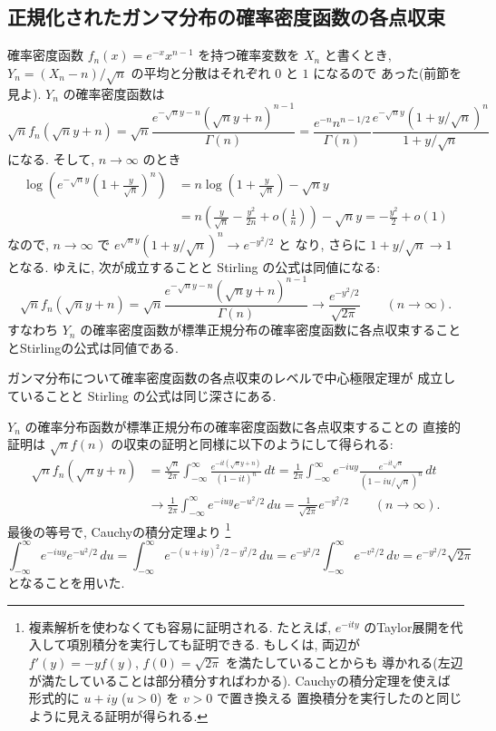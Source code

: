\documentclass[12pt,twoside]{jarticle}
\theoremstyle{jplain}
\theoremstyle{jplain}
\theoremstyle{jplain}
\numberwithin{theorem}{section}
\numberwithin{equation}{section}
\numberwithin{figure}{section}
\numberwithin{table}{section}
\begin{document}

\subsection{正規化されたガンマ分布の確率密度函数の各点収束}

確率密度函数 $f_n(x)=e^{-x}x^{n-1}$ を持つ確率変数を $X_n$ と書くとき,
$Y_n=(X_n-n)/\sqrt{n}$ の平均と分散はそれぞれ $0$ と $1$ になるので
あった(前節を見よ).  $Y_n$ の確率密度函数は
\[
\sqrt{n}f_n(\sqrt{n}y+n)
=\sqrt{n}\frac{e^{-\sqrt{n}y-n}(\sqrt{n}y+n)^{n-1}}{\Gamma(n)}
=\frac{e^{-n}n^{n-1/2}}{\Gamma(n)} 
 \frac{e^{-\sqrt{n}y}(1+y/\sqrt{n})^n}{1+y/\sqrt{n}}
\]
になる. そして, $n\to\infty$ のとき
\begin{align*}
\log\left(e^{-\sqrt{n}y}\left(1+\frac{y}{\sqrt{n}}\right)^n\right)
&=
n\log\left(1+\frac{y}{\sqrt{n}}\right)-\sqrt{n}y
\\ &
=n\left(\frac{y}{\sqrt{n}}-\frac{y^2}{2n}+o\left(\frac{1}{n}\right)\right)
-\sqrt{n}y
=-\frac{y^2}{2}+o(1)
\end{align*}
なので, $n\to\infty$ で $e^{\sqrt{n}y}(1+y/\sqrt{n})^n\to e^{-y^2/2}$ と
なり, さらに $1+y/\sqrt{n}\to 1$ となる. 
ゆえに, 次が成立することと Stirling の公式は同値になる:
\[
\sqrt{n}f_n(\sqrt{n}y+n)
=\sqrt{n}\frac{e^{-\sqrt{n}y-n}(\sqrt{n}y+n)^{n-1}}{\Gamma(n)}
\longrightarrow
\frac{e^{-y^2/2}}{\sqrt{2\pi}}
\qquad (n\to\infty).
\]
すなわち $Y_n$ の確率密度函数が標準正規分布の確率密度函数に各点収束すること
とStirlingの公式は同値である.

ガンマ分布について確率密度函数の各点収束のレベルで中心極限定理が
成立していることと Stirling の公式は同じ深さにある.

$Y_n$ の確率分布函数が標準正規分布の確率密度函数に各点収束することの
直接的証明は $\sqrt{n}f(n)$ の収束の証明と同様に以下のようにして得られる:
\begin{align*}
\sqrt{n}f_n(\sqrt{n}y+n)
&=
\frac{\sqrt{n}}{2\pi}
\int_{-\infty}^\infty
\frac{e^{-it(\sqrt{n}y+n)}}{(1-it)^n}\,dt
=\frac{1}{2\pi}
\int_{-\infty}^\infty
e^{-iuy}\frac{e^{-it\sqrt{n}}}{(1-iu/\sqrt{n})^n}\,dt
\\ &
\longrightarrow
\frac{1}{2\pi}
\int_{-\infty}^\infty e^{-iuy}e^{-u^2/2}\,du
=
\frac{1}{\sqrt{2\pi}}e^{-y^2/2}
\qquad(n\to\infty).
\end{align*}
最後の等号で, Cauchyの積分定理より%
\footnote{複素解析を使わなくても容易に証明される.
たとえば, $e^{-ity}$ のTaylor展開を代入して項別積分を実行しても証明できる.
もしくは, 両辺が $f'(y)=-y f(y)$, $f(0)=\sqrt{2\pi}$ を満たしていることからも
導かれる(左辺が満たしていることは部分積分すればわかる).  
Cauchyの積分定理を使えば
形式的に $u+iy$ ($u>0$) を $v>0$ で置き換える
置換積分を実行したのと同じように見える証明が得られる.}
\[
\int_{-\infty}^\infty e^{-iuy}e^{-u^2/2}\,du
=\int_{-\infty}^\infty e^{-(u+iy)^2/2-y^2/2}\,du
=e^{-y^2/2}\int_{-\infty}^\infty e^{-v^2/2}\,dv
=e^{-y^2/2}\sqrt{2\pi}
\]
となることを用いた.
\end{document}
